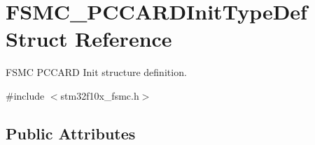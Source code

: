 \hypertarget{struct_f_s_m_c___p_c_c_a_r_d_init_type_def}{}\section{F\+S\+M\+C\+\_\+\+P\+C\+C\+A\+R\+D\+Init\+Type\+Def Struct Reference}
\label{struct_f_s_m_c___p_c_c_a_r_d_init_type_def}


F\+S\+MC P\+C\+C\+A\+RD Init structure definition.  




{\ttfamily \#include $<$stm32f10x\+\_\+fsmc.\+h$>$}

\subsection*{Public Attributes}
